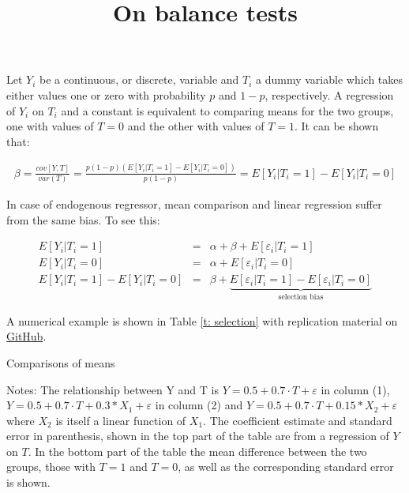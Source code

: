 \documentclass[11pt, oneside]{article}   	%
\date{}
\title{On balance tests}
\begin{document}
\maketitle
Let  $Y_i $ be a continuous, or discrete, variable and  $ T_i $ a dummy variable which takes either values one or zero with probability $p$ and $1-p$, respectively. A regression of $Y_i $ on $T_i$ and a constant is equivalent to comparing means for the two groups, one with values of $T=0$ and the other with values of $T=1$. It can be shown that:


 \begin{align*}
\beta = \frac{cov[Y, T]}{var(T)}=\frac{p(1-p)(E[Y_i|T_i=1]- E[Y_i|T_i=0])}{p(1-p)}=E[Y_i|T_i=1]- E[Y_i|T_i=0]
 \end{align*}

In case of endogenous regressor, mean comparison and linear regression suffer from the same bias. To see this:

 \begin{align*}
 E[Y_i|T_i=1] &=&  \alpha +  \beta  +  E[\varepsilon_i|T_i=1] \\
 E[Y_i|T_i=0] &=&  \alpha  + E[\varepsilon_i|T_i=0]\\
 E[Y_i|T_i=1]- E[Y_i|T_i=0] &= &  \beta +  \underset{\text{selection bias}}{\underbrace{ E[\varepsilon_i|T_i=1] -   E[\varepsilon_i|T_i=0] }}
 \end{align*}

 A numerical example is shown in Table \ref{t: selection} with replication material on \href{https://github.com/CEU-Economics-and-Business/ECBS6233-Empirical-Research/tree/master/code}{GitHub}.\\

\begin{table} [H]
\begin{center}
 
 \caption{Comparisons of means \label{t: selection}}



\linespread{1.5}
\vspace{0.1cm}
\par
\begin{minipage}{0.8\linewidth}
\baselineskip10pt
{\scriptsize {Notes:  The relationship between Y and T is $ Y=0.5+ 0.7 \cdot T+ \varepsilon $ in column (1), $ Y=0.5+ 0.7 \cdot T+0.3* X_1 + \varepsilon $ in column (2) and $ Y=0.5+ 0.7 \cdot T+0.15* X_2 + \varepsilon $ where $X_2$ is itself a linear function of $X_1$. The coefficient estimate and standard error in parenthesis, shown in the top part of the table are from a regression of $Y$ on $T$. In the bottom part of the table the mean difference between the two groups, those with $T=1$ and $T=0$, as well as the corresponding standard error is shown.}}
\end{minipage}
\end{center}
\end{table}
\end{document}
